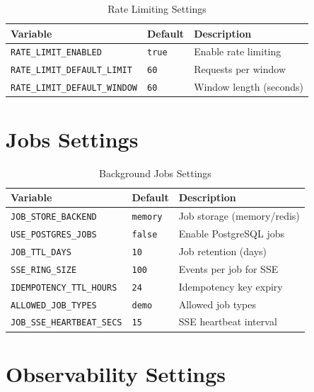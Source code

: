 \begin{table}[ht]
\centering
\caption{Rate Limiting Settings}
\label{tab:config-ratelimit}
\small
\begin{tabularx}{\textwidth}{llX}
    \hline
    \textbf{Variable} & \textbf{Default} & \textbf{Description} \\
    \hline
    \texttt{RATE\_LIMIT\_ENABLED} & \texttt{true} & Enable rate limiting \\
    \texttt{RATE\_LIMIT\_DEFAULT\_LIMIT} & \texttt{60} & Requests per window \\
    \texttt{RATE\_LIMIT\_DEFAULT\_WINDOW} & \texttt{60} & Window length (seconds) \\
    \hline
\end{tabularx}
\end{table}

\section{Jobs Settings}
\label{app:config:jobs}

\begin{table}[ht]
\centering
\caption{Background Jobs Settings}
\label{tab:config-jobs}
\small
\begin{tabularx}{\textwidth}{llX}
    \hline
    \textbf{Variable} & \textbf{Default} & \textbf{Description} \\
    \hline
    \texttt{JOB\_STORE\_BACKEND} & \texttt{memory} & Job storage (memory/redis) \\
    \texttt{USE\_POSTGRES\_JOBS} & \texttt{false} & Enable PostgreSQL jobs \\
    \texttt{JOB\_TTL\_DAYS} & \texttt{10} & Job retention (days) \\
    \texttt{SSE\_RING\_SIZE} & \texttt{100} & Events per job for SSE \\
    \texttt{IDEMPOTENCY\_TTL\_HOURS} & \texttt{24} & Idempotency key expiry \\
    \texttt{ALLOWED\_JOB\_TYPES} & \texttt{demo} & Allowed job types \\
    \texttt{JOB\_SSE\_HEARTBEAT\_SECS} & \texttt{15} & SSE heartbeat interval \\
    \hline
\end{tabularx}
\end{table}

\section{Observability Settings}
\label{app:config:observability}

